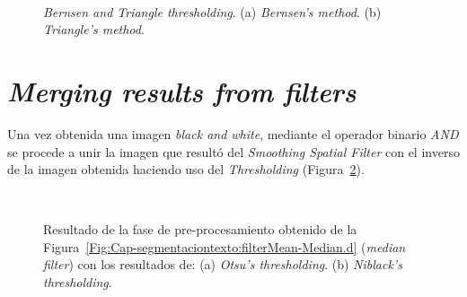 \begin{figure}[h]
	\centering
	\setlength{\fboxsep}{0pt}
   { }
   \\
  \caption[\textit{Bernsen and Triangle thresholding}]{\textit{Bernsen and 
  Triangle thresholding}. (a) \textit{Bernsen's method}. (b) \textit{Triangle's
method}.}
	\label{Fig:Cap-segmentaciontexto:thresholdingB}
\end{figure}

\section{\textit{Merging results from filters}}
Una vez obtenida una imagen \textit{black and white}, mediante el operador 
binario \textit{AND} se procede a unir la imagen que resultó del
\textit{Smoothing Spatial Filter} con el inverso de la imagen obtenida haciendo
uso del \textit{Thresholding}
(Figura~\ref{Fig:Cap-segmentaciontexto:resultado-preprocesing}).

\begin{figure}[h]
	\centering
   { }
   \\
  \caption[Resultado de la fase de pre-procesamiento]{Resultado de la fase de 
  pre-procesamiento obtenido de la
Figura~\ref{Fig:Cap-segmentaciontexto:filterMean-Median.d} (\textit{median
filter}) con los resultados de: (a) \textit{Otsu's thresholding}. (b)
\textit{Niblack's thresholding}.}
	\label{Fig:Cap-segmentaciontexto:resultado-preprocesing}
\end{figure}

